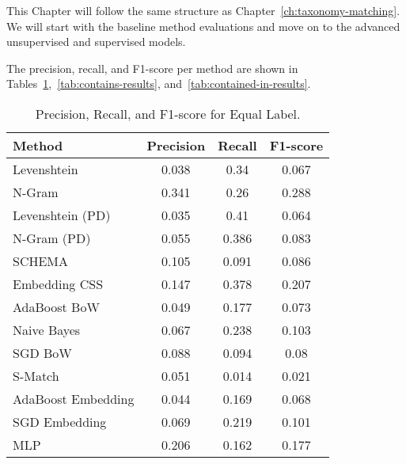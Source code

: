 This Chapter will follow the same structure as Chapter~\ref{ch:taxonomy-matching}.
We will start with the baseline method evaluations and move on to the advanced unsupervised and supervised models.

The precision, recall, and F1-score per method are shown in Tables~\ref{tab:equal-results},~\ref{tab:contains-results},
and~\ref{tab:contained-in-results}.

\begin{table}[htbp]
 \begin{center}
  \begin{tabular}{l|ccc}
   Method & Precision & Recall & F1-score \\
   \hline
   Levenshtein & 0.038 & 0.34 & 0.067 \\
   N-Gram & 0.341 & 0.26 & 0.288 \\
   Levenshtein (PD) & 0.035 & 0.41 & 0.064 \\
   N-Gram (PD) & 0.055 & 0.386 & 0.083 \\
   SCHEMA & 0.105 & 0.091 & 0.086 \\
   Embedding CSS & 0.147 & 0.378 & 0.207 \\
   AdaBoost BoW & 0.049 & 0.177 & 0.073 \\
   Naive Bayes & 0.067 & 0.238 & 0.103 \\
   SGD BoW & 0.088 & 0.094 & 0.08 \\
   S-Match & 0.051 & 0.014 & 0.021 \\
   AdaBoost Embedding & 0.044 & 0.169 & 0.068 \\
   SGD Embedding & 0.069 & 0.219 & 0.101 \\
   MLP & 0.206 & 0.162 & 0.177 \\
  \end{tabular}
  \caption{Precision, Recall, and F1-score for Equal Label.}
  \label{tab:equal-results}
 \end{center}
\end{table}

